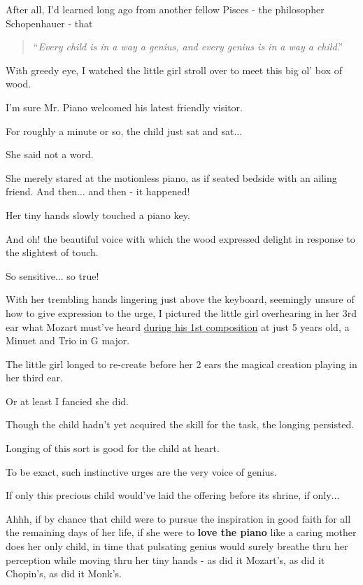 \documentclass{book}
\numberwithin{equation}{section}
\begin{document}
After all, I'd learned long ago from another fellow Pisces - the philosopher Schopenhauer - that

\begin{quotation}
    ``\textit{Every child is in a way a genius, and every genius is in a way a child}.''
\end{quotation}
With greedy eye, I watched the little girl stroll over to meet this big ol' box of wood.

I'm sure Mr. Piano welcomed his latest friendly visitor.

%
For roughly a minute or so, the child just sat and sat$\ldots$

%
She said not a word.

She merely stared at the motionless piano, as if seated bedside with an ailing friend. And then$\ldots$ and then - it happened!

%
Her tiny hands slowly touched a piano key.

And oh! the beautiful voice with which the wood expressed delight in response to the slightest of touch.

%
So sensitive$\ldots$ so true!

%
With her trembling hands lingering just above the keyboard, seemingly unsure of how to give expression to the urge, I pictured the little girl overhearing in her 3rd ear what Mozart must've heard \href{https://www.classicfm.com/composers/mozart/guides/first-composition-minuet-trio/#:~:text=His%20first%20documented%20composition%2C%20a,was%20just%20five%20years%20old.}{during his 1st composition} at just 5 years old, a Minuet and Trio in G major.

%
The little girl longed to re-create before her 2 ears the magical creation playing in her third ear.

Or at least I fancied she did.

%
Though the child hadn't yet acquired the skill for the task, the longing persisted.

Longing of this sort is good for the child at heart.

To be exact, such instinctive urges are the very voice of genius.

%
If only this precious child would've laid the offering before its shrine, if only$\ldots$

%
Ahhh, if by chance that child were to pursue the inspiration in good faith for all the remaining days of her life, if she were to \textbf{love the piano} like a caring mother does her only child, in time that pulsating genius would surely breathe thru her perception while moving thru her tiny hands - as did it Mozart's, as did it Chopin's, as did it Monk's.
\end{document}
